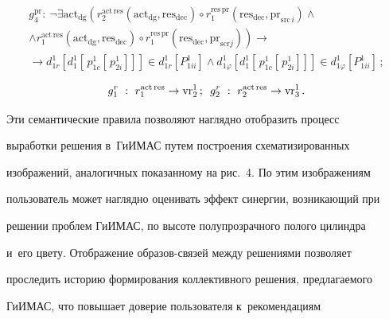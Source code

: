 \begin{multline*}


g_4^{\mathrm{pr}}:\ \neg\exists \mathrm{act}_{\mathrm{dg}}\left( r_2^{\mathrm{act\,res}} \left( 


\mathrm{act}_{\mathrm{dg}}, \mathrm{res}_{\mathrm{dec}}\right)\circ 


r_1^{\mathrm{res\,pr}}


\left( \mathrm{res}_{\mathrm{dec}}, \mathrm{pr}_{\mathrm{src}\,i}\right)\wedge\right.\\


\left.\wedge r_1^{\mathrm{act\,res}} \left( \mathrm{act}_{\mathrm{dg}}, \mathrm{res}_{\mathrm{dec}}\right)


\circ r_1^{\mathrm{res\,pr}}\left( \mathrm{res}_{\mathrm{dec}}, 


\mathrm{pr}_{\mathrm{scr}j}\right)\right)\to{}\\


{}\to d^1_{1r}\left[ d_1^1\left[\, p^1_{1c}\left[\,p^1_{2i}\right]\right]\right]


\in d^1_{1r}\left[ P^1_{1ii}\right]\wedge d^1_{1\varphi}\left[


d_1^1\left[\,p^1_{1c}\left[ \,p^1_{2i}\right]\right]\right]\in d^1_{1\varphi}\left[ P^1_{1ii}\right]\,;


\end{multline*}


$$


g_1^r\ :\  r_1^{\mathrm{act\,res}}\to \mathrm{vr}_2^1\,;\enskip g_2^r\ :\ r_2^{\mathrm{act\,res}}\to


\mathrm{vr}_3^1\,.


$$


     Эти семантические правила позволяют наглядно отобразить процесс 


выработки решения в~\mbox{ГиИМАС} путем построения схематизированных 


изображений, аналогичных показанному на рис.~4. По этим изображениям 


пользователь может наглядно оценивать эффект синергии, возникающий при 


решении проблем \mbox{ГиИМАС}, по высоте полупрозрачного полого цилиндра 


и~его цвету. Отображение образов-связей между решениями позволяет 


проследить историю формирования коллективного решения, предлагаемого 


\mbox{ГиИМАС}, что повышает доверие пользователя к~рекомендациям 


